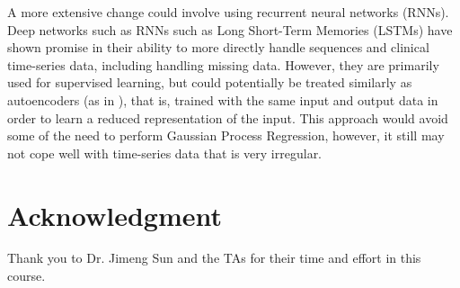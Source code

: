 \documentclass[journal]{IEEEtran}
\begin{document}
A more extensive change could involve using recurrent neural networks
(RNNs).  Deep networks such as RNNs such as Long Short-Term Memories
(LSTMs) have shown promise in their ability to more directly handle
sequences\cite{Sutskever2014} and clinical time-series data, including
handling missing data\cite{Lipton2015, Lipton2015a, Lipton2016}.
However, they are primarily used for supervised learning, but could
potentially be treated similarly as autoencoders (as in
\cite{Klapper-Rybicka2001}), that is, trained with the same input and
output data in order to learn a reduced representation of the input.
This approach would avoid some of the need to perform Gaussian Process
Regression, however, it still may not cope well with time-series data
that is very irregular.

\section*{Acknowledgment}
Thank you to Dr. Jimeng Sun and the TAs for their time and effort in
this course.




\end{document}
